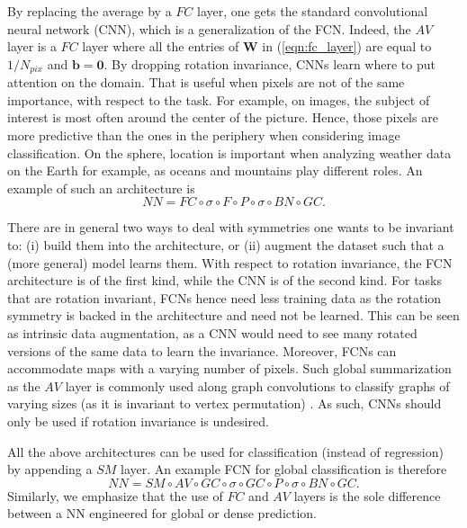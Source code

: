\documentclass[final,twocolumn,3p,times,sort&compress]{elsarticle}
\newcommand{\eqnref}[1]{(\ref{eqn:#1})}
\renewcommand{\b}[1]{{\bm{#1}}}   %
\newcommand{\1}{\b{1}}              %
\newcommand{\0}{\b{0}}              %
\newcommand{\W}{\b{W}}
\begin{document}
By replacing the average by a $FC$ layer, one gets the standard convolutional neural network (CNN), which is a generalization of the FCN.
Indeed, the $AV$ layer is a $FC$ layer where all the entries of $\W$ in \eqnref{fc_layer} are equal to $1/N_{pix}$ and $\b b = \b 0$.
By dropping rotation invariance, CNNs learn where to put attention on the domain.
That is useful when pixels are not of the same importance, with respect to the task.
For example, on images, the subject of interest is most often around the center of the picture.
Hence, those pixels are more predictive than the ones in the periphery when considering image classification.
On the sphere, location is important when analyzing weather data on the Earth for example, as oceans and mountains play different roles.
An example of such an architecture is
\begin{equation*}
	NN = FC \circ \sigma \circ F \circ P \circ \sigma \circ BN \circ GC.
\end{equation*}

There are in general two ways to deal with symmetries one wants to be invariant to: (i) build them into the architecture, or (ii) augment the dataset such that a (more general) model learns them.
With respect to rotation invariance, the FCN architecture is of the first kind, while the CNN is of the second kind.
For tasks that are rotation invariant, FCNs hence need less training data as the rotation symmetry is backed in the architecture and need not be learned.
This can be seen as intrinsic data augmentation, as a CNN would need to see many rotated versions of the same data to learn the invariance.
Moreover, FCNs can accommodate maps with a varying number of pixels.
Such global summarization as the $AV$ layer is commonly used along graph convolutions to classify graphs of varying sizes (as it is invariant to vertex permutation) \citep{duvenaud2015gcn, li2015gatedgnn}.
As such, CNNs should only be used if rotation invariance is undesired.

All the above architectures can be used for classification (instead of regression) by appending a $SM$ layer.
An example FCN for global classification is therefore
\begin{equation*}
	NN = SM \circ AV \circ GC \circ \sigma \circ GC \circ P \circ \sigma \circ BN \circ GC.
\end{equation*}
Similarly, we emphasize that the use of $FC$ and $AV$ layers is the sole difference between a NN engineered for global or dense prediction.
\end{document}
